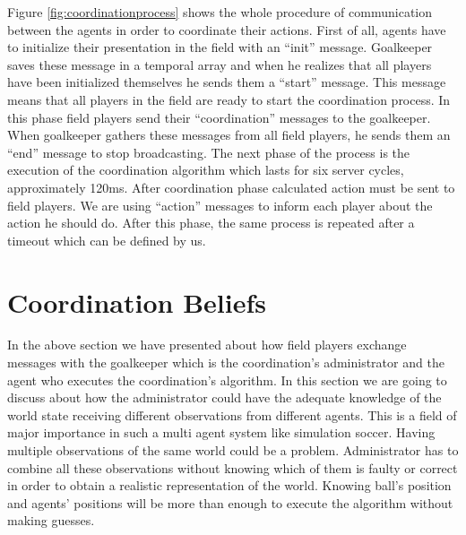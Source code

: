 Figure \ref{fig:coordinationprocess} shows the whole procedure of communication between the agents in order to coordinate their actions. First of all, agents have to initialize their presentation in the field with an ``init'' message. Goalkeeper saves these message in a temporal array and when he realizes that all players have been initialized themselves he sends them a ``start'' message. This message means that all players in the field are ready to start the coordination process. In this phase field players send their ``coordination'' messages to the goalkeeper. When goalkeeper gathers these messages from all field players, he sends them an ``end'' message to stop broadcasting. The next phase of the process is the execution of the coordination algorithm which lasts for six server cycles, approximately 120ms. After coordination phase calculated action must be sent to field players. We are using ``action'' messages to inform each player about the action he should do. After this phase, the same process is repeated after a timeout which can be defined by us.
\section{Coordination Beliefs}
In the above section we have presented about how field players exchange messages with the goalkeeper which is the coordination's administrator and the agent who executes the coordination's algorithm. In this section we are going to discuss about how the administrator could have the adequate knowledge of the world state receiving different observations from different agents. This is a field of major importance in such a multi agent system like simulation soccer. Having multiple observations of the same world could be a problem. Administrator has to combine all these observations without knowing which of them is faulty or correct in order to obtain a realistic representation of the world. Knowing ball's position and agents' positions will be more than enough to execute the algorithm without making guesses.

